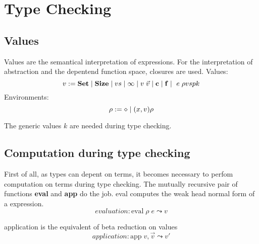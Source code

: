 \section{Type Checking}

\renewcommand\Check[4]{#1,#2\;\vdash\;#3\uparrow#4}
\newcommand\Infer[4]{#1,#2\;\vdash\;#3\downarrow#4}
\newcommand\IsType[3]{#1,#2\;\vdash\;#3\uparrow\Set}
\newcommand\EqVal[2]{\vdash\;#1\leftrightarrow#2}
\newcommand\Eval[3]{\mathrm{eval}\;#1\;#2\leadsto#3}
\newcommand\App[3]{\mathrm{app}\;#1,#2\leadsto#3}
\newcommand\AppFun[3]{\mathrm{appFun}\;#1,#2,\leadsto#3}
\newcommand\Fapp[6]{\mathrm{fapp}\;#1,#2,#3,#4,#5\leadsto#6}
\newcommand\Whnf[2]{\mathrm{whnf}\;#1\leadsto#2}
\newcommand\Lookup[3]{#1(#2) = #3}
\newcommand\LeqVal[2]{\vdash\;#1\leq#2}
\subsection{Values}
Values are the semantical interpretation of expressions.
For the interpretation of abstraction and the depentend function space, closures are used.
Values:
\[ v := \mathbf{Set} \;\vert\; \mathbf{Size} \;\vert\; vs \;\vert\; \infty \;\vert\; v \; \vec{v} \;\vert\; \mathbf{c} \;\vert\; \mathbf{f} \;\vert\; \ e \; \rho vsp k \]
Environments:
\[ \rho := \diamond \;\vert\; (x,v) \rho \]

The generic values $k$ are needed during type checking.
\subsection{Computation during type checking}
First of all, as types can depent on terms, it becomes necessary to perfom computation on terms during type checking.
The mutually recursive pair of functions 
\textbf{eval} and \textbf{app} do the job.
eval computes the weak head normal form of a expression.
\[ evaluation : \Eval{\rho}{e}{v}\]

application is the equivalent of beta reduction on values
\[ application : \App{v}{\vec{v}}{v'}\]

